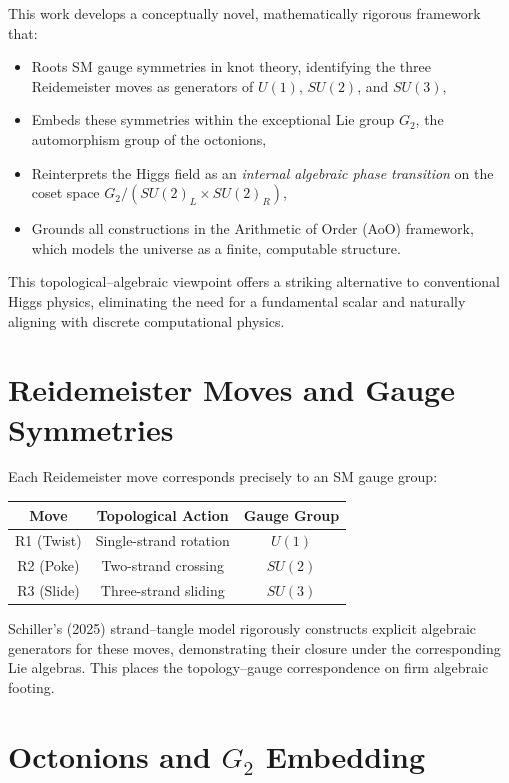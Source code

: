 \documentclass[12pt]{article}
\begin{document}
This work develops a conceptually novel, mathematically rigorous framework that:

\begin{itemize}
    \item Roots SM gauge symmetries in knot theory, identifying the three Reidemeister moves as generators of $U(1)$, $SU(2)$, and $SU(3)$,
    \item Embeds these symmetries within the exceptional Lie group $G_2$, the automorphism group of the octonions,
    \item Reinterprets the Higgs field as an \emph{internal algebraic phase transition} on the coset space $G_2 / (SU(2)_L \times SU(2)_R)$,
    \item Grounds all constructions in the Arithmetic of Order (AoO) framework, which models the universe as a finite, computable structure.
\end{itemize}

This topological--algebraic viewpoint offers a striking alternative to conventional Higgs physics, eliminating the need for a fundamental scalar and naturally aligning with discrete computational physics.

\section{Reidemeister Moves and Gauge Symmetries}

Each Reidemeister move corresponds precisely to an SM gauge group:

\begin{center}
\begin{tabular}{|c|c|c|}
\hline
\textbf{Move} & \textbf{Topological Action} & \textbf{Gauge Group} \\
\hline
R1 (Twist) & Single-strand rotation & $U(1)$ \\
R2 (Poke) & Two-strand crossing      & $SU(2)$ \\
R3 (Slide) & Three-strand sliding     & $SU(3)$ \\
\hline
\end{tabular}
\end{center}

Schiller’s (2025) strand--tangle model rigorously constructs explicit algebraic generators for these moves, demonstrating their closure under the corresponding Lie algebras. This places the topology--gauge correspondence on firm algebraic footing.

\section{Octonions and $G_2$ Embedding}
\end{document}
